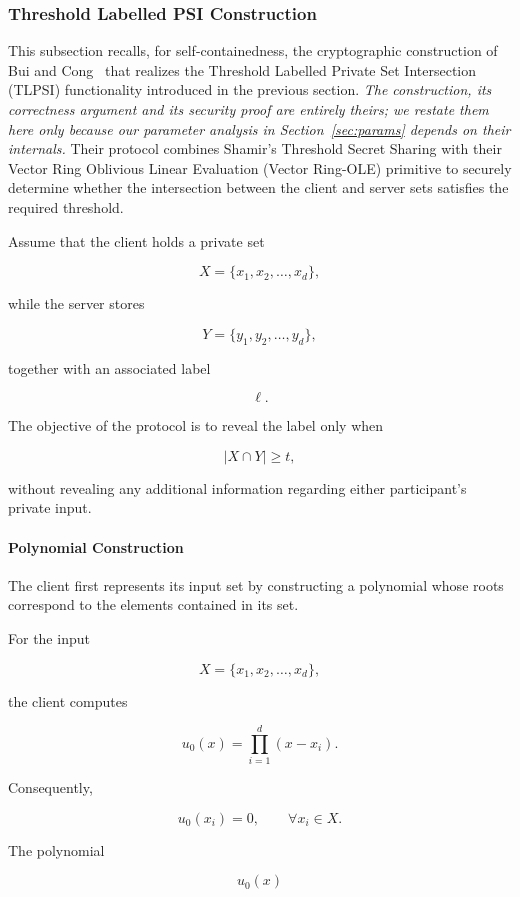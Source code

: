 \documentclass[11pt,a4paper]{article}
\begin{document}
\subsubsection{Threshold Labelled PSI Construction}

This subsection recalls, for self-containedness, the cryptographic construction of Bui and Cong~\cite{BuiCong25} that realizes the Threshold Labelled Private Set Intersection (TLPSI) functionality introduced in the previous section. \emph{The construction, its correctness argument and its security proof are entirely theirs; we restate them here only because our parameter analysis in Section~\ref{sec:params} depends on their internals.} Their protocol combines Shamir's Threshold Secret Sharing with their Vector Ring Oblivious Linear Evaluation (Vector Ring-OLE) primitive to securely determine whether the intersection between the client and server sets satisfies the required threshold.

Assume that the client holds a private set

\[
X=\{x_1,x_2,\ldots,x_d\},
\]

while the server stores

\[
Y=\{y_1,y_2,\ldots,y_d\},
\]

together with an associated label

\[
\ell.
\]

The objective of the protocol is to reveal the label only when

\[
|X\cap Y|
\ge t,
\]

without revealing any additional information regarding either participant's private input.

\paragraph{Polynomial Construction}

The client first represents its input set by constructing a polynomial whose roots correspond to the elements contained in its set.

For the input

\[
X=\{x_1,x_2,\ldots,x_d\},
\]

the client computes

\[
u_0(x)
=
\prod_{i=1}^{d}
(x-x_i).
\]

Consequently,

\[
u_0(x_i)=0,
\qquad
\forall x_i\in X.
\]

The polynomial

\[
u_0(x)
\]
\end{document}

